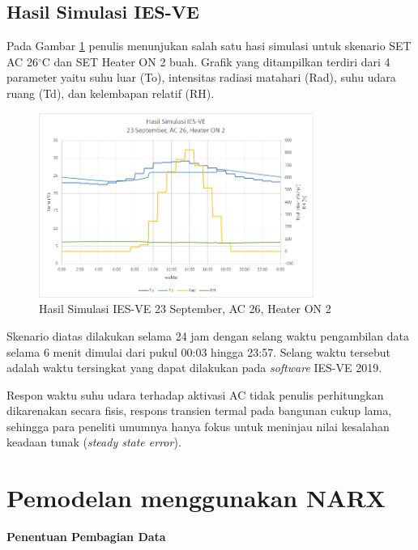 \subsection{Hasil Simulasi IES-VE}
Pada Gambar \ref{fig:5:HasilIESVE} penulis menunjukan salah satu hasi simulasi untuk skenario SET AC 26$^{\circ}$C dan SET Heater ON 2 buah. Grafik yang ditampilkan terdiri dari 4 parameter yaitu suhu luar (To), intensitas radiasi matahari (Rad), suhu udara ruang (Td), dan kelembapan relatif (RH). 

\begin{figure}[h]
	\centering
	\includegraphics[width=0.8\textwidth]{figures/HasilSimulasiIESVE}
	\caption{Hasil Simulasi IES-VE 23 September, AC 26, Heater ON 2}
	\label{fig:5:HasilIESVE}
\end{figure}

Skenario diatas dilakukan selama 24 jam dengan selang waktu pengambilan data selama 6 menit dimulai dari pukul 00:03 hingga 23:57. Selang waktu tersebut adalah waktu tersingkat yang dapat dilakukan pada \textit{software} IES-VE 2019.

Respon waktu suhu udara terhadap aktivasi AC tidak penulis perhitungkan dikarenakan secara fisis, respons transien termal pada bangunan cukup lama, sehingga para peneliti umumnya hanya fokus untuk meninjau nilai kesalahan keadaan tunak (\textit{steady state error}).

\section{Pemodelan menggunakan NARX}

\noindent \textbf{Penentuan Pembagian Data} 

